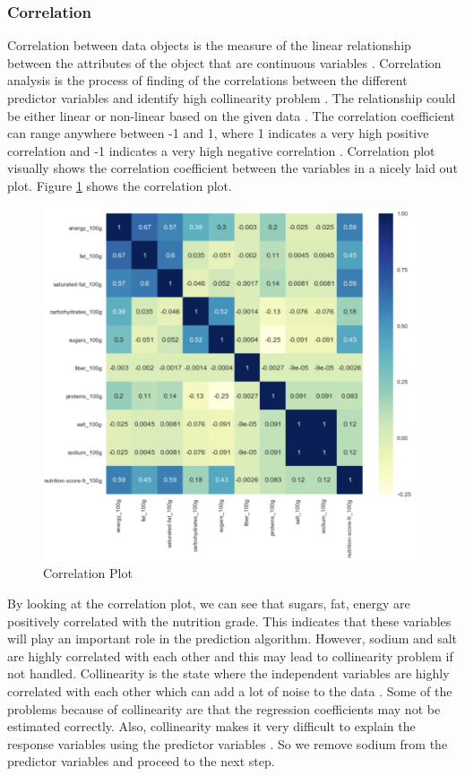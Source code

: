 \documentclass[sigconf]{acmart}
\begin{document}
\subsubsection{Correlation} 
Correlation between data objects is the measure of the linear relationship between the attributes of the object that are continuous variables \cite{book-tan}. Correlation analysis is the process of finding of the correlations between the different predictor variables and identify high collinearity problem \cite{book-shai}. The relationship could be either linear or non-linear based on the given data \cite{book-tan}. The correlation coefficient can range anywhere between -1 and 1, where 1 indicates a very high positive correlation and -1 indicates a very high negative correlation \cite{book-shai}. Correlation plot visually shows the correlation coefficient between the variables in a nicely laid out plot. Figure \ref{fig:Fig3} shows the correlation plot. \\

\begin{figure}
\includegraphics[width=1.0\columnwidth]{images/fig3.png}
\caption{Correlation Plot \cite{code-base}}
\label{fig:Fig3}
\end{figure}

By looking at the correlation plot, we can see that sugars, fat, energy are positively correlated with the nutrition grade. This indicates that these variables will play an important role in the prediction algorithm. However, sodium and salt are highly correlated with each other and this may lead to collinearity problem if not handled. Collinearity is the state where the independent variables are highly correlated with each other which can add a lot of noise to the data \cite{www-coll}. Some of the problems because of collinearity are that the regression coefficients may not be estimated correctly. Also, collinearity makes it very difficult to explain the response variables using the predictor variables \cite{www-coll}. So we remove sodium from the predictor variables and proceed to the next step.
\end{document}
